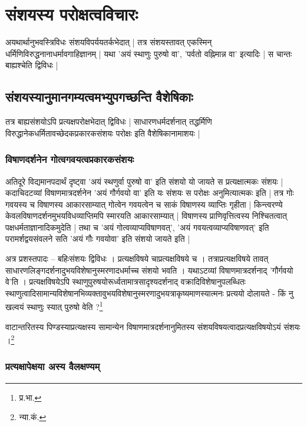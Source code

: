 \section{संशयस्य परोक्षत्वविचारः}

अयथार्थानुभवस्त्रिविधः संशयविपर्ययतर्कभेदात् | तत्र संशयस्तावत् एकस्मिन् धर्मिणिविरुद्धनानाधर्मावगाहिज्ञानम् | यथा 'अयं स्थाणुः पुरुषो वा', 'पर्वतो वह्निमान्न वा' इत्यादिः | स चान्तः बाह्यश्चेति द्विविधः |

\subsection{संशयस्यानुमानगम्यत्वमभ्युपगच्छन्ति वैशेषिकाः}

तत्र बाह्यसंशयोऽपि प्रत्यक्षपरोक्षभेदात् द्विविधः | साधारणधर्मदर्शनात् तद्धर्मिणि विरुद्धानेकधर्मितावच्छेदकप्रकारकसंशयः परोक्षः इति वैशेषिकानामाशयः |

\subsubsection{विषाणदर्शनेन गोत्वगवयत्वप्रकारकसंशयः}

अतिदूरे विद्यमानपदार्थं दृष्ट्वा 'अयं स्थणुर्वा पुरुषो वा' इति संशयो यो जायते स प्रत्यक्षात्मकः संशयः | कदाचिदटव्यां विषाणमात्रदर्शनेन 'अयं गौर्गवयो वा' इति यः संशयः स परोक्षः अनुमित्यात्मकः इति | तत्र गोः गवयस्य च विषाणस्य आकारसाम्यात् गोत्वेन गवयत्वेन च साकं विषाणस्य व्याप्तिः गृहीता | किन्त्वरण्ये केवलविषाणदर्शनमुभयविधव्याप्तिमपि स्मारयति आकारसाम्यात् | विषाणस्य प्राणिवृत्तित्वस्य निश्चितत्वात् पक्षधर्मताज्ञानादिकमुदेति | तथा च 'अयं गोत्वव्याप्यविषाणवत्', 'अयं गवयत्वव्याप्यविषाणवत्' इति परामर्शद्वयसंवलने सति 'अयं गौः गवयोवा' इति संशयो जायते इति |

{\fontsize{11.7}{0}\selectfont\s अत्र प्रशस्तपादः – बहिःसंशयः द्विविधः । प्रत्यक्षविषये चाप्रत्यक्षविषये च । तत्राप्रत्यक्षविषये तावत् साधारणलिङ्गदर्शनादुभयविशेषानुस्मरणादधर्माच्च संशयो भवति । यथाऽटव्यां विषाणमात्रदर्शनाद् 'गौर्गवयो वे'ति । प्रत्यक्षविषयेऽपि स्थाणुपुरुषयोरूर्ध्वतामात्रसादृश्यदर्शनाद् वक्रादिविशेषानुपलब्धितः स्थाणुत्वादिसामान्यविशेषानभिव्यक्तावुभयविशेषानुस्मरणादुभयत्राकृष्यमाणस्यात्मनः प्रत्ययो दोलायते -  किं नु खल्वयं स्थाणुः स्यात् पुरुषो वेति ?\footnote{प्र.भा.}}

{\fontsize{11.7}{0}\selectfont\s वाटान्तरितस्य  पिण्डस्याप्रत्यक्षस्य सामान्येन विषाणमात्रदर्शनानुमितस्य संशयविषयत्वादप्रत्यक्षविषयोऽयं संशयः ।\footnote{न्या.कं.}}

\subsubsection{प्रत्यक्षापेक्षया अस्य वैलक्षण्यम्}

